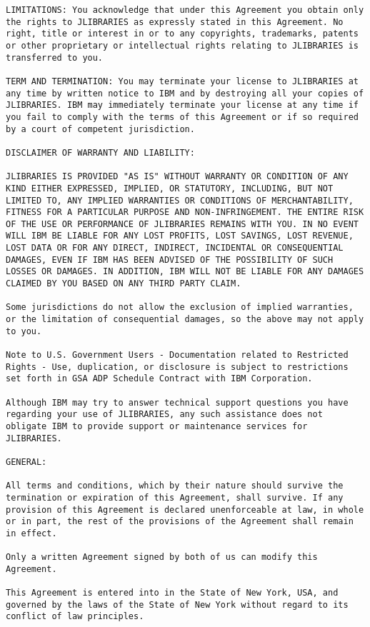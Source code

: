 \begin{verbatim}
LIMITATIONS: You acknowledge that under this Agreement you obtain only
the rights to JLIBRARIES as expressly stated in this Agreement. No
right, title or interest in or to any copyrights, trademarks, patents
or other proprietary or intellectual rights relating to JLIBRARIES is
transferred to you.

TERM AND TERMINATION: You may terminate your license to JLIBRARIES at
any time by written notice to IBM and by destroying all your copies of
JLIBRARIES. IBM may immediately terminate your license at any time if
you fail to comply with the terms of this Agreement or if so required
by a court of competent jurisdiction.

DISCLAIMER OF WARRANTY AND LIABILITY: 

JLIBRARIES IS PROVIDED "AS IS" WITHOUT WARRANTY OR CONDITION OF ANY
KIND EITHER EXPRESSED, IMPLIED, OR STATUTORY, INCLUDING, BUT NOT
LIMITED TO, ANY IMPLIED WARRANTIES OR CONDITIONS OF MERCHANTABILITY,
FITNESS FOR A PARTICULAR PURPOSE AND NON-INFRINGEMENT. THE ENTIRE RISK
OF THE USE OR PERFORMANCE OF JLIBRARIES REMAINS WITH YOU. IN NO EVENT
WILL IBM BE LIABLE FOR ANY LOST PROFITS, LOST SAVINGS, LOST REVENUE,
LOST DATA OR FOR ANY DIRECT, INDIRECT, INCIDENTAL OR CONSEQUENTIAL
DAMAGES, EVEN IF IBM HAS BEEN ADVISED OF THE POSSIBILITY OF SUCH
LOSSES OR DAMAGES. IN ADDITION, IBM WILL NOT BE LIABLE FOR ANY DAMAGES
CLAIMED BY YOU BASED ON ANY THIRD PARTY CLAIM.

Some jurisdictions do not allow the exclusion of implied warranties,
or the limitation of consequential damages, so the above may not apply
to you.

Note to U.S. Government Users - Documentation related to Restricted
Rights - Use, duplication, or disclosure is subject to restrictions
set forth in GSA ADP Schedule Contract with IBM Corporation.

Although IBM may try to answer technical support questions you have
regarding your use of JLIBRARIES, any such assistance does not
obligate IBM to provide support or maintenance services for
JLIBRARIES.

GENERAL: 

All terms and conditions, which by their nature should survive the
termination or expiration of this Agreement, shall survive. If any
provision of this Agreement is declared unenforceable at law, in whole
or in part, the rest of the provisions of the Agreement shall remain
in effect.

Only a written Agreement signed by both of us can modify this Agreement. 

This Agreement is entered into in the State of New York, USA, and
governed by the laws of the State of New York without regard to its
conflict of law principles.

\end{verbatim}





